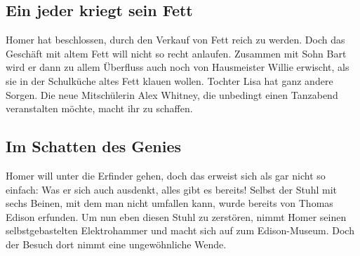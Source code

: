 	
\subsection{Ein jeder kriegt sein Fett}\label{5F20}
Homer hat beschlossen, durch den Verkauf von Fett reich zu werden. Doch das Geschäft mit altem Fett will nicht so recht anlaufen. Zusammen mit Sohn Bart wird er dann zu allem Überfluss auch noch von Hausmeister Willie erwischt, als sie in der Schulküche altes Fett klauen wollen. Tochter Lisa hat ganz andere Sorgen. Die neue Mitschülerin Alex Whitney, die unbedingt einen Tanzabend veranstalten möchte, macht ihr zu schaffen.


	
\subsection{Im Schatten des Genies}\label{5F21}
Homer will unter die Erfinder gehen, doch das erweist sich als gar nicht so einfach: Was er sich auch ausdenkt, alles gibt es bereits! Selbst der Stuhl mit sechs Beinen, mit dem man nicht umfallen kann, wurde bereits von Thomas Edison erfunden. Um nun eben diesen Stuhl zu zerstören, nimmt Homer seinen selbstgebastelten Elektrohammer und macht sich auf zum Edison-Museum. Doch der Besuch dort nimmt eine ungewöhnliche Wende.

